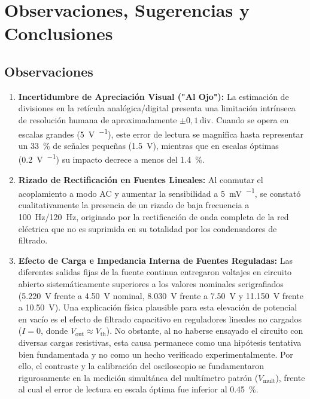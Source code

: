 
\section{Observaciones, Sugerencias y Conclusiones}
\label{sec:conclusiones}

\subsection{Observaciones}
\begin{enumerate}
    \item \textbf{Incertidumbre de Apreciación Visual ("Al Ojo"):}
    La estimación de divisiones en la retícula analógica/digital presenta una limitación intrínseca de resolución humana de aproximadamente $\pm 0{,}1\,\text{div}$. Cuando se opera en escalas grandes (\qty{5}{\volt\per\division}), este error de lectura se magnifica hasta representar un \qty{33}{\percent} de señales pequeñas (\qty{1,5}{\volt}), mientras que en escalas óptimas (\qty{0,2}{\volt\per\division}) su impacto decrece a menos del \qty{1,4}{\percent}.
    
    \item \textbf{Rizado de Rectificación en Fuentes Lineales:}
    Al conmutar el acoplamiento a modo $\text{AC}$ y aumentar la sensibilidad a \qty{5}{\milli\volt\per\division}, se constató cualitativamente la presencia de un rizado de baja frecuencia a \qty{100}{\hertz}/\qty{120}{\hertz}, originado por la rectificación de onda completa de la red eléctrica que no es suprimida en su totalidad por los condensadores de filtrado.

    \item \textbf{Efecto de Carga e Impedancia Interna de Fuentes Reguladas:}
    Las diferentes salidas fijas de la fuente continua entregaron voltajes en circuito abierto sistemáticamente superiores a los valores nominales serigrafiados (\qty{5,220}{\volt} frente a \qty{4,50}{\volt} nominal, \qty{8,030}{\volt} frente a \qty{7,50}{\volt} y \qty{11,150}{\volt} frente a \qty{10,50}{\volt}). Una explicación física plausible para esta elevación de potencial en vacío es el efecto de filtrado capacitivo en reguladores lineales no cargados ($I = 0$, donde $V_{\text{out}} \approx V_{\text{th}}$). No obstante, al no haberse ensayado el circuito con diversas cargas resistivas, esta causa permanece como una hipótesis tentativa bien fundamentada y no como un hecho verificado experimentalmente. Por ello, el contraste y la calibración del osciloscopio se fundamentaron rigurosamente en la medición simultánea del multímetro patrón ($V_{\text{mult}}$), frente al cual el error de lectura en escala óptima fue inferior al \qty{0,45}{\percent}.


\end{enumerate}
